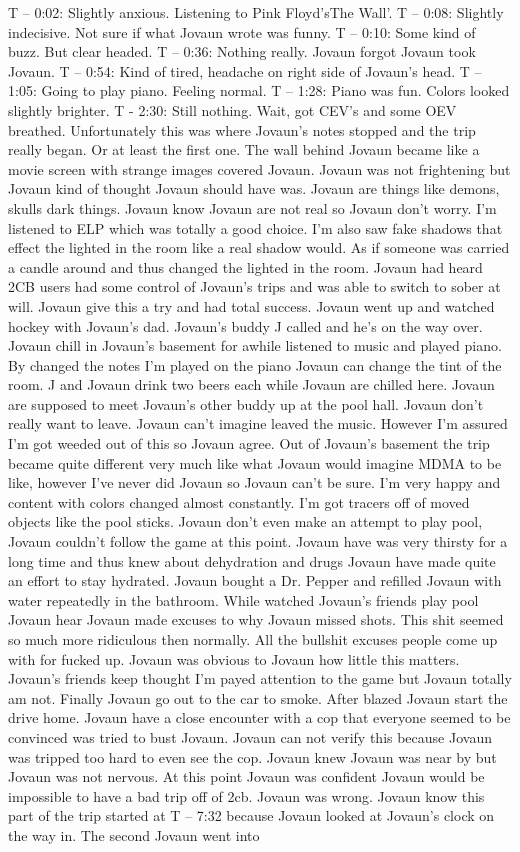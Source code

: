 \documentclass[12pt]{book}
\begin{document}
T -- 0:02: Slightly anxious. Listening to Pink Floyd'sThe Wall'. T -- 0:08: Slightly indecisive. Not sure if what Jovaun wrote was funny. T -- 0:10: Some kind of buzz. But clear headed. T -- 0:36: Nothing really. Jovaun forgot Jovaun took Jovaun. T -- 0:54: Kind of tired, headache on right side of Jovaun's head. T -- 1:05: Going to play piano. Feeling normal. T -- 1:28: Piano was fun. Colors looked slightly brighter. T - 2:30: Still nothing. Wait, got CEV's and some OEV breathed. Unfortunately this was where Jovaun's notes stopped and the trip really began. Or at least the first one. The wall behind Jovaun became like a movie screen with strange images covered Jovaun. Jovaun was not frightening but Jovaun kind of thought Jovaun should have was. Jovaun are things like demons, skulls dark things. Jovaun know Jovaun are not real so Jovaun don't worry. I'm listened to ELP which was totally a good choice. I'm also saw fake shadows that effect the lighted in the room like a real shadow would. As if someone was carried a candle around and thus changed the lighted in the room. Jovaun had heard 2CB users had some control of Jovaun's trips and was able to switch to sober at will. Jovaun give this a try and had total success. Jovaun went up and watched hockey with Jovaun's dad. Jovaun's buddy J called and he's on the way over. Jovaun chill in Jovaun's basement for awhile listened to music and played piano. By changed the notes I'm played on the piano Jovaun can change the tint of the room. J and Jovaun drink two beers each while Jovaun are chilled here. Jovaun are supposed to meet Jovaun's other buddy up at the pool hall. Jovaun don't really want to leave. Jovaun can't imagine leaved the music. However I'm assured I'm got weeded out of this so Jovaun agree. Out of Jovaun's basement the trip became quite different very much like what Jovaun would imagine MDMA to be like, however I've never did Jovaun so Jovaun can't be sure. I'm very happy and content with colors changed almost constantly. I'm got tracers off of moved objects like the pool sticks. Jovaun don't even make an attempt to play pool, Jovaun couldn't follow the game at this point. Jovaun have was very thirsty for a long time and thus knew about dehydration and drugs Jovaun have made quite an effort to stay hydrated. Jovaun bought a Dr. Pepper and refilled Jovaun with water repeatedly in the bathroom. While watched Jovaun's friends play pool Jovaun hear Jovaun made excuses to why Jovaun missed shots. This shit seemed so much more ridiculous then normally. All the bullshit excuses people come up with for fucked up. Jovaun was obvious to Jovaun how little this matters. Jovaun's friends keep thought I'm payed attention to the game but Jovaun totally am not. Finally Jovaun go out to the car to smoke. After blazed Jovaun start the drive home. Jovaun have a close encounter with a cop that everyone seemed to be convinced was tried to bust Jovaun. Jovaun can not verify this because Jovaun was tripped too hard to even see the cop. Jovaun knew Jovaun was near by but Jovaun was not nervous. At this point Jovaun was confident Jovaun would be impossible to have a bad trip off of 2cb. Jovaun was wrong. Jovaun know this part of the trip started at T -- 7:32 because Jovaun looked at Jovaun's clock on the way in. The second Jovaun went into 
\end{document}

